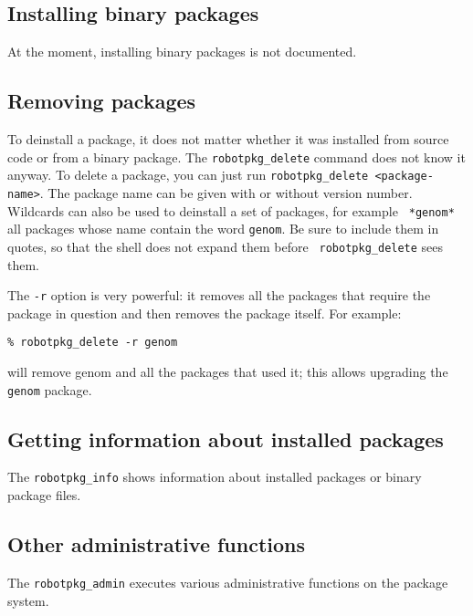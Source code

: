 

\subsection{Installing binary packages} %

At the moment, installing binary packages is not documented.


\subsection{Removing packages} %

To deinstall a package, it does not matter whether it was installed from source
code or  from a  binary package.  The  {\tt robotpkg\_delete} command  does not
know it  anyway.  To delete a  package, you can just  run {\tt robotpkg\_delete
<package-name>}.  The package name can be given with or without version number.
Wildcards can  also be used  to deinstall a  set of packages, for  example {\tt
*genom*} all  packages whose  name contain  the word {\tt  genom}.  Be  sure to
include them  in quotes,  so that the  shell does  not expand them  before {\tt
robotpkg\_delete} sees them.

The {\tt -r} option is very powerful: it  removes all the packages that require
the package in question and then removes the package itself. For example:

\begin{verbatim}
% robotpkg_delete -r genom
\end{verbatim}

will remove genom and all the packages that used it; this allows
upgrading the {\tt genom} package.


\subsection{Getting information about installed packages} %

The {\tt  robotpkg\_info} shows information about installed  packages or binary
package files.


\subsection{Other administrative functions} %

The  {\tt robotpkg\_admin}  executes  various administrative  functions on  the
package system.
